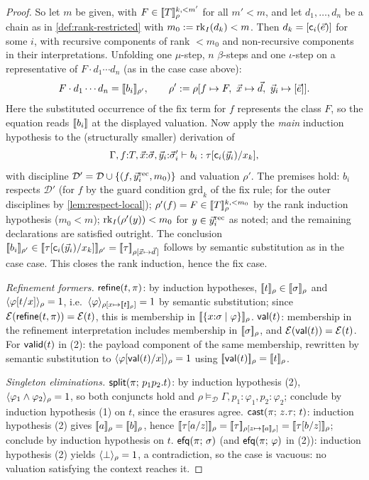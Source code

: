 \begin{proof}
So let $m$ be given, with $F \in [\![ T ]\!]_{\rho}^{k,<m'}$ for all $m' <
m$, and let $d_1, \dots, d_n$ be a chain as in
\cref{def:rank-restricted} with $m_0 \mathrel{:=} \mathrm{rk}_{I}(d_k) < m$.  Then
$d_k = [\mathsf{c}_i(\vec{e})]$ for some $i$, with recursive components
of rank $< m_0$ and non-recursive components in their interpretations.
Unfolding one $\mu$-step, $n$ $\beta$-steps and one $\iota$-step on a
representative of $F \cdot d_1 \cdots d_n$ (as in the case case above):
\[
  F \cdot d_1 \cdots d_n = [\![ b_i ]\!]_{\rho'}, \qquad
  \rho' \mathrel{:=} \rho[f \mapsto F,\ \vec{x} \mapsto \vec{d},\
  \vec{y}_i \mapsto [\vec{e}]].
\]
Here the substituted occurrence of the fix term for $f$ represents the
class $F$, so the equation reads $[\![ b_i ]\!]$ at the displayed valuation.
Now apply the \emph{main} induction hypothesis to the (structurally
smaller) derivation of
\[
  \Gamma, f{:}T, \vec{x}{:}\vec{\sigma}, \vec{y}_i{:}\vec{\sigma}'_i
  \vdash b_i : \tau[\mathsf{c}_i(\vec{y}_i)/x_k],
\]
with discipline $\mathcal{D}' = \mathcal{D} \cup \{(f,
\vec{y}_i^{\mathrm{rec}}, m_0)\}$ and valuation $\rho'$.  The premises hold: $b_i$ respects $\mathcal{D}'$ (for $f$ by
the guard condition $\mathrm{grd}_k$ of the fix rule; for the outer
disciplines by \cref{lem:respect-local}); $\rho'(f) = F \in
[\![ T ]\!]_{\rho}^{k, <m_0}$ by the rank induction hypothesis ($m_0 < m$);
$\mathrm{rk}_{I}(\rho'(y)) < m_0$ for $y \in \vec{y}_i^{\mathrm{rec}}$ as noted;
and the remaining declarations are satisfied outright.  The conclusion
$[\![ b_i ]\!]_{\rho'} \in
[\![ \tau[\mathsf{c}_i(\vec{y}_i)/x_k] ]\!]_{\rho'} =
[\![ \tau ]\!]_{\rho[\vec{x} \mapsto \vec{d}\,]}$ follows by semantic
substitution as in the case case.  This closes the rank induction, hence
the fix case.

\emph{Refinement formers.}  $\mathsf{refine}(t,\pi)$: by induction hypotheses,
$[\![ t ]\!]_\rho \in [\![ \sigma ]\!]_{\rho}$ and
$\langle \varphi[t/x] \rangle_{\rho} = 1$, i.e.\
$\langle \varphi \rangle_{\rho[x \mapsto [\![ t ]\!]_\rho]} = 1$ by semantic
substitution; since $\mathcal{E}(\mathsf{refine}(t,\pi)) = \mathcal{E}(t)$, this is
membership in $[\![ \{x{:}\sigma \mid \varphi\} ]\!]_{\rho}$.  $\mathsf{val}(t)$:
membership in the refinement interpretation includes membership in
$[\![ \sigma ]\!]_{\rho}$, and $\mathcal{E}(\mathsf{val}(t)) = \mathcal{E}(t)$.  For
$\mathsf{valid}(t)$ in (2): the payload component of the same membership,
rewritten by semantic substitution to
$\langle \varphi[\mathsf{val}(t)/x] \rangle_{\rho} = 1$ using
$[\![ \mathsf{val}(t) ]\!]_\rho = [\![ t ]\!]_\rho$.

\emph{Singleton eliminations.}  $\mathsf{split}(\pi;\,p_1 p_2.t)$: by induction
hypothesis (2), $\langle \varphi_1 \wedge \varphi_2 \rangle_{\rho} = 1$, so both
conjuncts hold and $\rho \vDash_{\mathcal{D}} \Gamma, p_1{:}\varphi_1,
p_2{:}\varphi_2$; conclude by induction hypothesis (1) on $t$, since the
erasures agree.  $\mathsf{cast}(\pi;\,z.\tau;\,t)$: induction hypothesis (2) gives
$[\![ a ]\!]_\rho = [\![ b ]\!]_\rho$, hence
$\semr{\subst{\tau}{a}{z}}{\rho} = \semr{\tau}{\rho[z \mapsto
\sem{a}_\rho]} = \semr{\subst{\tau}{b}{z}}{\rho}$; conclude by induction
hypothesis on $t$.  $\mathsf{efq}(\pi;\,\sigma)$ (and $\mathsf{efq}(\pi;\,\varphi)$ in (2)): induction hypothesis (2) yields $\langle \bot \rangle_{\rho} =
1$, a contradiction, so the case is vacuous: no valuation satisfying the
context reaches it.


\end{proof}
